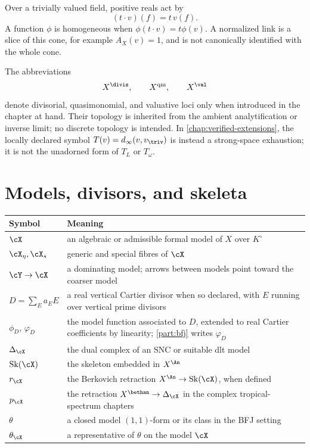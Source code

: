 Over a trivially valued field, positive reals act by
\[
 (t\cdot v)(f)=t\,v(f).
\]
A function \(\phi\) is homogeneous when
\(\phi(t\cdot v)=t\phi(v)\).  A normalized link is a slice of this cone,
for example \(A_X(v)=1\), and is not canonically identified with the whole
cone.

The abbreviations
\[
 X^{\divis},\qquad X^{\mathrm{qm}},\qquad X^{\val}
\]
denote divisorial, quasimonomial, and valuative loci only when introduced in
the chapter at hand.  Their topology is inherited from the ambient
analytification or inverse limit; no discrete topology is intended.
In \cref{chap:verified-extensions}, the locally declared symbol
\(T(v)=d_\infty(v,v_{\triv})\) is instead a strong-space exhaustion; it is
not the unadorned form of \(T_L\) or \(T_\omega\).

\section{Models, divisors, and skeleta}
\label{sec:appK-models}


\begin{center}
\begin{tabular}{@{}p{}p{}@{}}
\toprule
Symbol & Meaning \\
\midrule
\(\cX\)
  & an algebraic or admissible formal model of \(X\) over \(K^\circ\) \\
\(\cX_\eta,\cX_s\)
  & generic and special fibres of \(\cX\) \\
\(\cY\to\cX\)
  & a dominating model; arrows between models point toward the coarser
    model \\
\(D=\sum_E a_EE\)
  & a real vertical Cartier divisor when so declared, with \(E\) running
    over vertical prime divisors \\
\(\phi_D\), \(\varphi_D\)
  & the model function associated to \(D\), extended to real Cartier
    coefficients by linearity; \cref{part:bfj} writes \(\varphi_D\) \\
\(\Delta_\cX\)
  & the dual complex of an SNC or suitable dlt model \\
\(\operatorname{Sk}(\cX)\)
  & the skeleton embedded in \(X^{\An}\) \\
\(r_\cX\)
  & the Berkovich retraction
    \(X^{\An}\to\operatorname{Sk}(\cX)\), when defined \\
\(p_\cX\)
  & the retraction \(X^{\bethan}\to\Delta_\cX\) in the complex
    tropical-spectrum chapters \\
\(\theta\)
  & a closed model \((1,1)\)-form or its class in the BFJ setting \\
\(\theta_\cX\)
  & a representative of \(\theta\) on the model \(\cX\) \\
\bottomrule
\end{tabular}
\end{center}

